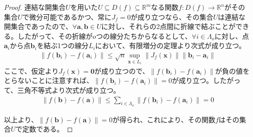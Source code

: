 \documentclass[dvipdfmx]{jsarticle}
\begin{document}
\begin{proof}
連結な開集合$U$を用いた$U \subseteq D(f) \subseteq \mathbb{R}^{m}$なる関数$f:D(f) \rightarrow \mathbb{R}^{n}$がその集合$U$で微分可能であるかつ、常に$J_{f} = 0$が成り立つなら、その集合$U$は連結な開集合であったので、$\forall\mathbf{a},\mathbf{b} \in U$に対し、それらの2点間に折線で結ぶことができる。したがって、その折線が$o$つの線分たちからなるとして、$\forall i \in \varLambda_{o}$に対し、点$\mathbf{a}_{i}$から点$\mathbf{b}_{i}$を結ぶ1つの線分$L_{i}$において、有限増分の定理より次式が成り立つ。
\begin{align*}
\left\| f\left( \mathbf{b}_{i} \right) - f\left( \mathbf{a}_{i} \right) \right\| \leq \sqrt{n}\sup_{\mathbf{x} \in L_{i}}\left\| J_{f}\left( \mathbf{x} \right) \right\|\left\| \mathbf{b}_{i} - \mathbf{a}_{i} \right\|
\end{align*}
ここで、仮定より$J_{f}\left( \mathbf{x} \right) = \mathbf{0}$が成り立つので、$\left\| f\left( \mathbf{b}_{i} \right) - f\left( \mathbf{a}_{i} \right) \right\|$が負の値をとらないことに注意すれば、$\left\| f\left( \mathbf{b}_{i} \right) - f\left( \mathbf{a}_{i} \right) \right\| = 0$が成り立つ。したがって、三角不等式より次式が成り立つ。
\begin{align*}
\left\| f\left( \mathbf{b} \right) - f\left( \mathbf{a} \right) \right\| \leq \sum_{i \in \varLambda_{o}} \left\| f\left( \mathbf{b}_{i} \right) - f\left( \mathbf{a}_{i} \right) \right\| = 0
\end{align*}\par
以上より、$\left\| f\left( \mathbf{b} \right) - f\left( \mathbf{a} \right) \right\| = 0$が得られ、これにより、その関数$f$はその集合$U$で定数である。
\end{proof}
\end{document}
